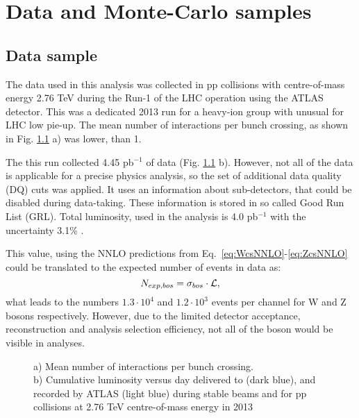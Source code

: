 \chapter{Data and Monte-Carlo samples}
\section{Data sample}
The data used in this analysis was collected in pp collisions with centre-of-mass energy 2.76 TeV during the Run-1 of the LHC operation using the ATLAS detector. This was a dedicated 2013 run for a heavy-ion group with unusual for LHC low pie-up. The mean number of interactions per bunch crossing, as shown in Fig. \ref{ris:DataSampleMu} a) was lower, than 1. 

The this run \atlas collected 4.45 pb$^{-1}$ of data (Fig. \ref{ris:DataSampleMu} b). However, not all of the data is applicable for a precise physics analysis, so the set of additional data quality (DQ) cuts was applied.  It uses an information about sub-detectors, that could be disabled during data-taking. These information is stored in so called Good Run List (GRL). Total luminosity, used in the analysis is 4.0 pb$^{-1}$ with the uncertainty 3.1\% \cite{myLumi}.

This value, using the NNLO predictions from Eq.~\ref{eq:WcsNNLO}-\ref{eq:ZcsNNLO} could be translated to the expected number of events in data as:
\begin{equation}
N_{exp, bos} = \sigma_{bos} \cdot \mathcal{L},
\end{equation}
what leads to the numbers $1.3\cdot 10^4$ and $1.2\cdot10^3$ events per channel for W and Z bosons respectively. However, due to the limited detector acceptance, reconstruction and analysis selection efficiency, not all of the boson would be visible in analyses.

\begin{figure}[!b]
\begin{minipage}[h]{0.49\linewidth}
\end{minipage}
\hfill
\begin{minipage}[h]{0.49\linewidth}
\end{minipage}
\caption{a) Mean number of interactions per bunch crossing. \\
b) Cumulative luminosity versus day delivered to (dark blue), and recorded by ATLAS (light blue) during stable beams and for pp collisions at 2.76 TeV centre-of-mass energy in 2013}
\label{ris:DataSampleMu}
\end{figure}

